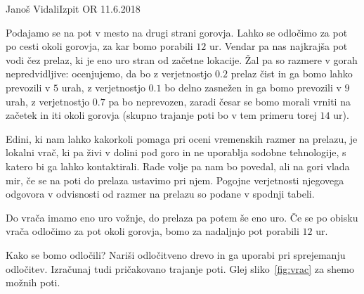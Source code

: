 \begin{naloga}{Janoš Vidali}{Izpit OR 11.6.2018}
\begin{vprasanje}
Podajamo se na pot v mesto na drugi strani gorovja.
Lahko se odločimo za pot po cesti okoli gorovja,
za kar bomo porabili $12$ ur.
Vendar pa nas najkrajša pot vodi čez prelaz,
ki je eno uro stran od začetne lokacije.
Žal pa so razmere v gorah nepredvidljive:
ocenjujemo, da bo z verjetnostjo $0.2$ prelaz čist
in ga bomo lahko prevozili v $5$ urah,
z ve\-rjet\-nost\-jo $0.1$ bo delno zasnežen in ga bomo prevozili v $9$ urah,
z verjetnostjo $0.7$ pa bo neprevozen,
zaradi česar se bomo morali vrniti na začetek in iti okoli gorovja
(skupno trajanje poti bo v tem primeru torej $14$ ur).

Edini, ki nam lahko kakorkoli pomaga pri oceni vremenskih razmer na prelazu,
je lokalni vrač,
ki pa živi v dolini pod goro in ne uporablja sodobne tehnologije,
s katero bi ga lahko kontaktirali.
Rade volje pa nam bo povedal, ali na gori vlada mir,
če se na poti do prelaza ustavimo pri njem.
Pogojne verjetnosti njegovega odgovora v odvisnosti od razmer na prelazu
so podane v spodnji tabeli.
\begin{center}
\end{center}
Do vrača imamo eno uro vožnje, do prelaza pa potem še eno uro.
Če se po obisku vrača odločimo za pot okoli gorovja,
bomo za nadaljnjo pot porabili $12$ ur.

Kako se bomo odločili?
Nariši odločitveno drevo in ga uporabi pri sprejemanju odločitev.
Izračunaj tudi pričakovano trajanje poti.
Glej sliko~\ref{fig:vrac} za shemo možnih poti.

\begin{figure}[t]
\centering
{}
\end{figure}
\end{vprasanje}
\end{naloga}
